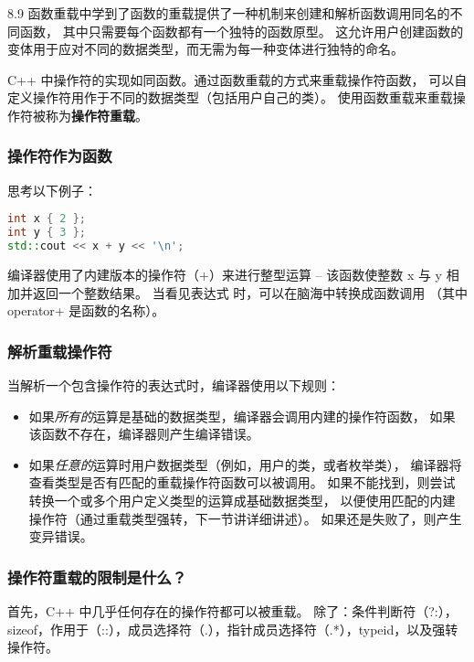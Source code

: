 \documentclass[../../LearnCpp.tex]{subfiles}
\begin{document}

8.9 函数重载中学到了函数的重载提供了一种机制来创建和解析函数调用同名的不同函数，
其中只需要每个函数都有一个独特的函数原型。
这允许用户创建函数的变体用于应对不同的数据类型，而无需为每一种变体进行独特的命名。

C++ 中操作符的实现如同函数。通过函数重载的方式来重载操作符函数，
可以自定义操作符用作于不同的数据类型（包括用户自己的类）。
使用函数重载来重载操作符被称为\textbf{操作符重载}。

\subsubsection*{操作符作为函数}

思考以下例子：

\begin{lstlisting}[language=C++]
int x { 2 };
int y { 3 };
std::cout << x + y << '\n';
\end{lstlisting}

编译器使用了内建版本的操作符（+）来进行整型运算 -- 该函数使整数 x 与 y 相加并返回一个整数结果。
当看见表达式  时，可以在脑海中转换成函数调用 （其中 operator+ 是函数的名称）。

\subsubsection*{解析重载操作符}

当解析一个包含操作符的表达式时，编译器使用以下规则：

\begin{itemize}
  \item 如果\textit{所有的}运算是基础的数据类型，编译器会调用内建的操作符函数，
        如果该函数不存在，编译器则产生编译错误。
  \item 如果\textit{任意的}运算时用户数据类型（例如，用户的类，或者枚举类），
        编译器将查看类型是否有匹配的重载操作符函数可以被调用。
        如果不能找到，则尝试转换一个或多个用户定义类型的运算成基础数据类型，
        以便使用匹配的内建操作符（通过重载类型强转，下一节讲详细讲述）。
        如果还是失败了，则产生变异错误。
\end{itemize}

\subsubsection*{操作符重载的限制是什么？}

首先，C++ 中几乎任何存在的操作符都可以被重载。
除了：条件判断符（?:），sizeof，作用于（::），成员选择符（.），指针成员选择符（.*），typeid，以及强转操作符。
\end{document}
